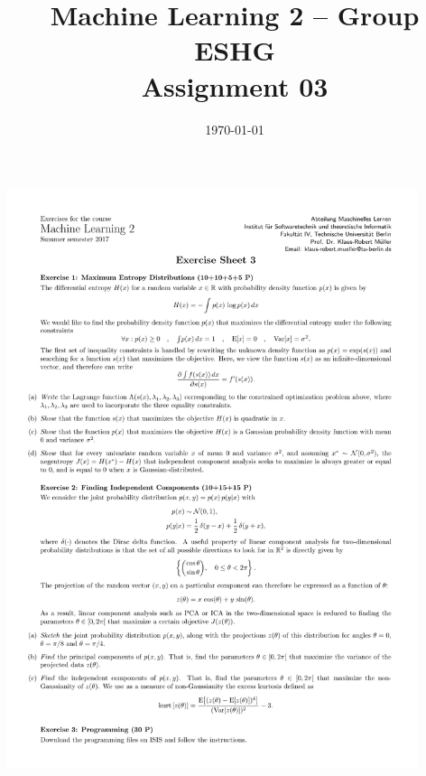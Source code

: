 \documentclass[11pt,a4paper]{article}
\title{Machine Learning 2 -- Group ESHG \\
        Assignment 03
}
\author{\students}
\date{\today}
\begin{document}
\maketitle

\includegraphics[clip, trim=0.5cm 2.5cm 0.5cm 4cm, width=0.90\textwidth]{sheet03.pdf}



\end{document}
